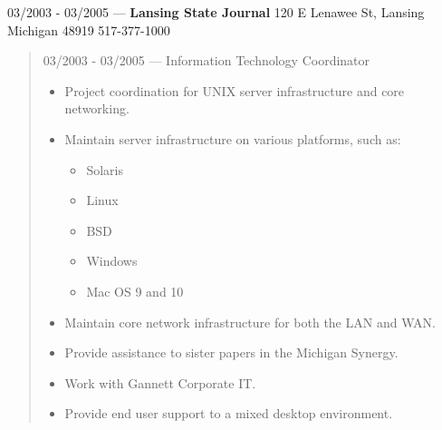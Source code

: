 03/2003 - 03/2005 --- {\bf Lansing State Journal} 120 E Lenawee St, Lansing Michigan 48919 517-377-1000
\begin{quote}
03/2003 - 03/2005 --- Information Technology Coordinator\\
\begin{itemize}
\item Project coordination for UNIX server infrastructure and core networking.
\item Maintain server infrastructure on various platforms, such as:
\begin{itemize}
\item Solaris
\item Linux
\item BSD
\item Windows
\item Mac OS 9 and 10
\end{itemize}
\item Maintain core network infrastructure for both the LAN and WAN.
\item Provide assistance to sister papers in the Michigan Synergy.
\item Work with Gannett Corporate IT.
\item Provide end user support to a mixed desktop environment.
\end{itemize}
\end{quote}
